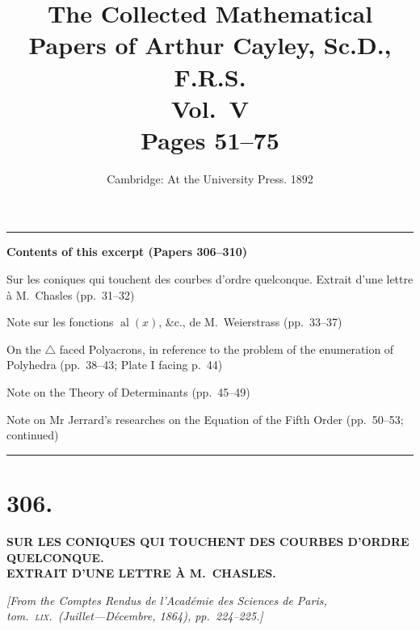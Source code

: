 \documentclass[11pt,a4paper]{article}
\title{\textbf{The Collected Mathematical Papers of Arthur Cayley, Sc.D., F.R.S.}\\[6pt]
\Large Vol.\ V\\[12pt]
\large Pages 51--75}
\author{}
\date{Cambridge: At the University Press. 1892}
\providecommand{\al}{\mathop{\mathrm{al}}\nolimits}
\begin{document}
\maketitle
\thispagestyle{empty}

\vspace{2em}
\noindent\rule{\textwidth}{0.4pt}
\vspace{1em}

\begin{center}
\textbf{Contents of this excerpt (Papers 306--310)}
\end{center}

\begin{enumerate}[label={[\arabic*]}]
\setcounter{enumi}{305}
\item Sur les coniques qui touchent des courbes d'ordre quelconque. Extrait d'une lettre \`{a} M.~Chasles (pp.\ 31--32)
\item Note sur les fonctions $\al(x)$, \&c., de M.~Weierstrass (pp.\ 33--37)
\item On the $\triangle$ faced Polyacrons, in reference to the problem of the enumeration of Polyhedra (pp.\ 38--43; Plate I facing p.\ 44)
\item Note on the Theory of Determinants (pp.\ 45--49)
\item Note on Mr Jerrard's researches on the Equation of the Fifth Order (pp.\ 50--53; continued)
\end{enumerate}

\vspace{1em}
\noindent\rule{\textwidth}{0.4pt}
\vspace{2em}

\section*{306.}

\begin{center}
\textbf{SUR LES CONIQUES QUI TOUCHENT DES COURBES D'ORDRE QUELCONQUE.}\\[0.4em]
\textbf{EXTRAIT D'UNE LETTRE \`{A} M.~CHASLES.}
\end{center}

\bigskip

\noindent\textit{[From the Comptes Rendus de l'Acad\'{e}mie des Sciences de Paris, tom.\ \textsc{lix}.\ (Juillet---D\'{e}cembre, 1864), pp.\ 224--225.]}
\end{document}

